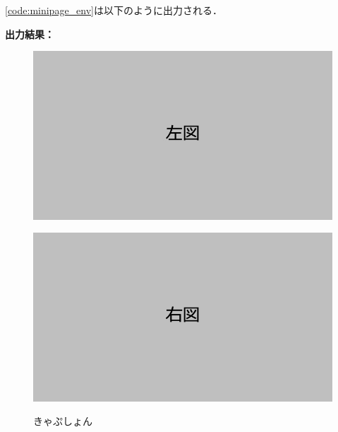 \code\ref{code:minipage_env}は以下のように出力される．

\noindent\textbf{出力結果：}\hrulefill\\
\vspace{-6mm}
\begin{figure}[tbph]
  \centering
  \vspace{4mm}
  \begin{minipage}{0.4\linewidth}
      \centering
      \includegraphics[width=\linewidth]{fig_left.jpeg}
      \label{fig:fig_left}
  \end{minipage}
  \hfill
  \begin{minipage}{0.4\linewidth}
      \centering
      \includegraphics[width=\linewidth]{fig_right.png}
      \label{fig:fig_right}
  \end{minipage}
  \caption{きゃぷしょん}
\end{figure}
\\\noindent\hrulefill  

